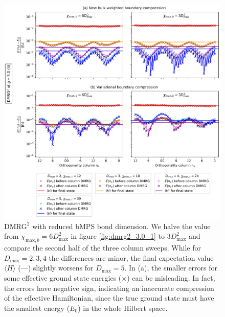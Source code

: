 \newpage
\vspace*{\fill}
\begin{figure}[H]
  \centering
  \includegraphics[width=1.0\linewidth]{dmrg_6_6_3.0_2.png}
  \caption{$\text{DMRG}^2$ with reduced bMPS bond dimension. We halve the value from $\chi_{\text{max}, b} = 6D_{\text{max}}^2$ in figure \ref{fig:dmrg2_3.0_1} to $3D_{\text{max}}^2$ and compare the second half of the three column sweeps. While for $D_{\text{max}} = 2, 3, 4$ the differences are minor, the final expectation value $\langle H \rangle$ (---) slightly worsens for $D_{\text{max}} = 5$. In (a), the smaller errors for some effective ground state energies ($\times$) can be misleading. In fact, the errors have negative sign, indicating an inaccurate compression of the effective Hamiltonian, since the true ground state must have the smallest energy ($E_0$) in the whole Hilbert space.}
\label{fig:dmrg2_3.0_2}
\end{figure}
\vspace*{\fill}

\newpage

